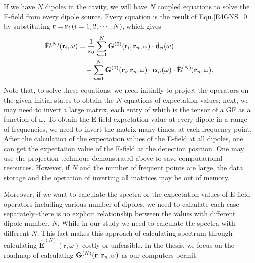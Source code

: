If we have $N$ dipoles in the cavity, we will have $N$ coupled equations to solve the E-field from every dipole source. Every equation is the result of Equ.\eqref{E4GNS_0} by substituting $\mathbf{r}=\mathbf{r}_i\,(i=1,2,\cdots, N)$, which gives
\begin{align}
 \label{E4GNS_i}
 \hat{\mathbf{E}}^{(N)}(\mathbf{r}_i,\omega) &=\frac{1}{\varepsilon_0}\sum_{n=1}^N{\mathbf{G}^{(0)}(\mathbf{r}_i,\mathbf{r}_n,\omega)\cdot \hat{\mathbf{d}}_n(\omega)} \\
 &\quad +\sum_{n=1}^N{\mathbf{G}^{(0)}(\mathbf{r}_i,\mathbf{r}_n,\omega)\cdot {\bm \alpha}_n(\omega) \cdot \hat{\mathbf{E}}^{(N)}(\mathbf{r}_n,\omega)}.
\end{align}
Note that, to solve these equations, we need initially to project the operators on the given initial states to obtain the $N$ equations of expectation values; next, we may need to invert a large matrix, each entry of which is the tensor of a GF as a function of $\omega$. To obtain the E-field expectation value at every dipole in a range of frequencies, we need to invert the matrix many times, at each frequency point. After the calculation of the expectation values of the E-field at all dipoles, one can get the expectation value of the E-field at the detection position. One may use the projection technique demonstrated above to save computational resources. However, if $N$ and the number of frequent points are large, the data storage and the operation of inverting all matrices may be out of memory.

Moreover, if we want to calculate the spectra or the expectation values of E-field operators including various number of dipoles,
we need to calculate each case separately--there is no explicit relationship between the values with different dipole number, $N$. While in our study we need to calculate the spectra with different $N$. This fact makes this approach of calculating spectrum through calculating $\hat{\mathbf{E}}^{(N)}(\mathbf{r},\omega)$ costly or unfeasible. In the thesis,
we focus on the roadmap of calculating $\mathbf{G}^{(N)}(\mathbf{r},\mathbf{r}_n,\omega)$ as our computers permit.




